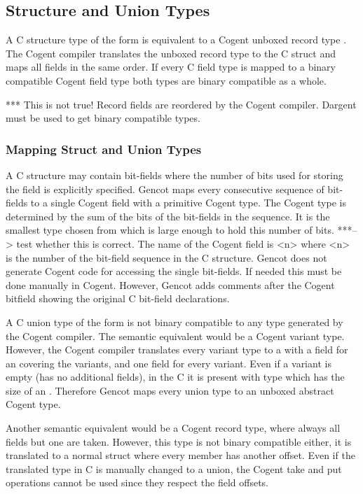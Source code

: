 \subsection{Structure and Union Types}
\label{design-types-struct}

A C structure type of the form  is equivalent to a Cogent unboxed record type .
The Cogent compiler translates the unboxed record type to the C struct and maps all fields in the same order.
If every C field type is mapped to a binary compatible Cogent field type both types are binary compatible as a whole.

*** This is not true! Record fields are reordered by the Cogent compiler. Dargent must be used to get binary compatible types.

\subsubsection{Mapping Struct and Union Types}
A C structure may contain bit-fields where the number of bits used for storing the field is explicitly specified.
Gencot maps every consecutive sequence of bit-fields to a single Cogent field with a primitive Cogent type.
The Cogent type is determined by the sum of the bits of the bit-fields in the sequence. It is the smallest 
type chosen from  which is large enough to hold this number of bits. 
***--> test whether this is correct.
The name of the
Cogent field is <n> where <n> is the number of the bit-field sequence in the C structure.
Gencot does not generate Cogent code for accessing the single bit-fields. If needed this must be done manually in Cogent.
However, Gencot adds comments after the Cogent bitfield showing the original C bit-field declarations.

A C union type of the form  is not binary compatible to any type generated by the Cogent compiler.
The semantic equivalent would be a Cogent variant type. However, the Cogent compiler translates every variant type
to a  with a field for an  covering the variants, and one field for every variant. Even if a variant
is empty (has no additional fields), in the C  it is present with type  which
has the size of an . Therefore Gencot maps every union type to an unboxed abstract Cogent type.

Another semantic equivalent would be a Cogent record type, where always all fields but one are taken. However,
this type is not binary compatible either, it is translated to a normal struct where every member has another
offset. Even if the translated type in C is manually changed to a union, the Cogent take and put operations cannot
be used since they respect the field offsets. 

